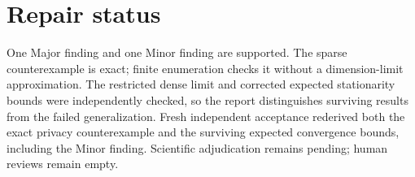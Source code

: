 \documentclass[10pt]{article}
\begin{document}
\section*{Repair status}
One Major finding and one Minor finding are supported. The sparse counterexample is exact; finite enumeration checks it without a dimension-limit approximation. The restricted dense limit and corrected expected stationarity bounds were independently checked, so the report distinguishes surviving results from the failed generalization. Fresh independent acceptance rederived both the exact privacy counterexample and the surviving expected convergence bounds, including the Minor finding. Scientific adjudication remains pending; human reviews remain empty.\par
\end{document}
